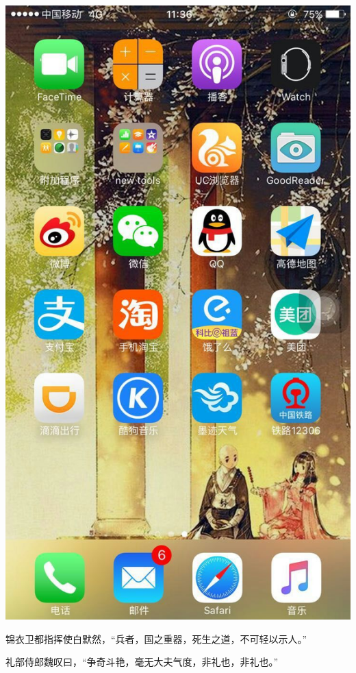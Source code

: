 \documentclass[12pt, a4paper]{book}
\begin{document}
\begin{CJK}{UTF8}{gbsn}
    \includegraphics[height=0.3\textheight]{./figure/desktop-6.jpg}

    锦衣卫都指挥使白默然，“兵者，国之重器，死生之道，不可轻以示人。”

    礼部侍郎魏叹曰，“争奇斗艳，毫无大夫气度，非礼也，非礼也。”

    \appendix

    

\end{CJK}
\end{document}
